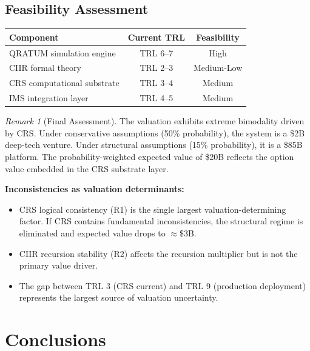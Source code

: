 \documentclass[11pt,a4paper]{article}
\theoremstyle{remark}
\newtheorem{remark}[definition]{Remark}
\begin{document}
\subsection{Feasibility Assessment}

\begin{center}
\renewcommand{\arraystretch}{1.2}
\begin{tabular}{lcc}
\toprule
\textbf{Component} & \textbf{Current TRL} & \textbf{Feasibility} \\
\midrule
QRATUM simulation engine   & TRL 6--7 & High \\
CIIR formal theory          & TRL 2--3 & Medium-Low \\
CRS computational substrate & TRL 3--4 & Medium \\
IMS integration layer       & TRL 4--5 & Medium \\
\bottomrule
\end{tabular}
\end{center}

\begin{remark}[Final Assessment]
\label{rem:final}
The valuation exhibits extreme bimodality driven by CRS.  Under
conservative assumptions (50\% probability), the system is a
\$2B deep-tech venture.  Under structural assumptions (15\%
probability), it is a \$85B platform.  The probability-weighted
expected value of \$20B reflects the option value embedded in the
CRS substrate layer.

\medskip
\noindent
\textbf{Inconsistencies as valuation determinants:}
\begin{itemize}[nosep]
  \item CRS logical consistency (R1) is the single largest
        valuation-determining factor.  If CRS contains fundamental
        inconsistencies, the structural regime is eliminated and
        expected value drops to $\approx$\$3B.
  \item CIIR recursion stability (R2) affects the recursion
        multiplier but is not the primary value driver.
  \item The gap between TRL 3 (CRS current) and TRL 9 (production
        deployment) represents the largest source of valuation
        uncertainty.
\end{itemize}
\end{remark}


\section{Conclusions}
\label{sec:conclusions}
\end{document}
